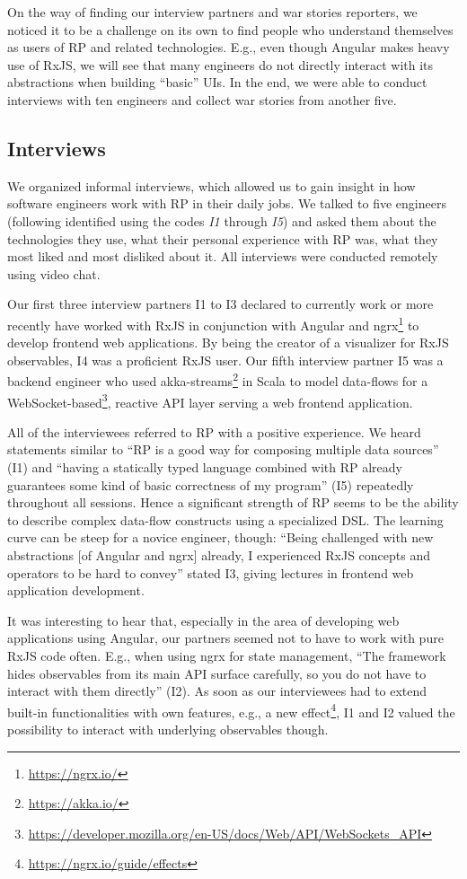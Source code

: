 \documentclass[sigplan,screen,review]{acmart}
\begin{document}
On the way of finding our interview partners and war stories reporters, we noticed it to be a challenge on its own to find people who understand themselves as users of RP and related technologies. E.g., even though Angular makes heavy use of RxJS, we will see that many engineers do not directly interact with its abstractions when building ``basic'' UIs. In the end, we were able to conduct interviews with ten engineers and collect war stories from another five.

\subsection{Interviews}

We organized informal interviews, which allowed us to gain insight in how software engineers work with RP in their daily jobs. We talked to five engineers (following identified using the codes \emph{I1} through \emph{I5}) and asked them about the technologies they use, what their personal experience with RP was, what they most liked and most disliked about it. All interviews were conducted remotely using video chat.

Our first three interview partners I1 to I3 declared to currently work or more recently have worked with RxJS in conjunction with Angular and ngrx\footnote{\url{https://ngrx.io/}} to develop frontend web applications. By being the creator of a visualizer for RxJS observables, I4 was a proficient RxJS user. Our fifth interview partner I5 was a backend engineer who used akka-streams\footnote{\url{https://akka.io/}} in Scala to model data-flows for a WebSocket-based\footnote{\url{https://developer.mozilla.org/en-US/docs/Web/API/WebSockets_API}}, reactive API layer serving a web frontend application.

All of the interviewees referred to RP with a positive experience. We heard statements similar to ``RP is a good way for composing multiple data sources'' (I1) and ``having a statically typed language combined with RP already guarantees some kind of basic correctness of my program'' (I5) repeatedly throughout all sessions. Hence a significant strength of RP seems to be the ability to describe complex data-flow constructs using a specialized DSL. The learning curve can be steep for a novice engineer, though: ``Being challenged with new abstractions [of Angular and ngrx] already, I experienced RxJS concepts and operators to be hard to convey'' stated I3, giving lectures in frontend web application development.

It was interesting to hear that, especially in the area of developing web applications using Angular, our partners seemed not to have to work with pure RxJS code often. E.g., when using ngrx for state management, ``The framework hides observables from its main API surface carefully, so you do not have to interact with them directly'' (I2). As soon as our interviewees had to extend built-in functionalities with own features, e.g., a new effect\footnote{\url{https://ngrx.io/guide/effects}}, I1 and I2 valued the possibility to interact with underlying observables though.
\end{document}
